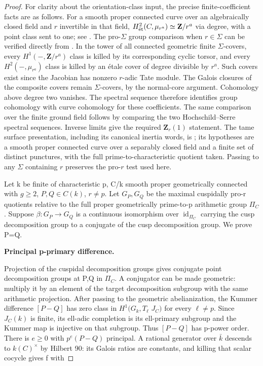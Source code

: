 \begin{proof}

For clarity about the orientation-class input, the precise finite-coefficient
facts are as follows. For a smooth proper connected curve over an
algebraically closed field and \(r\) invertible in that field,
\(H^2_{\et}(C,\mu_{r^a})\simeq\mathbf Z/r^a\) via degree, with a point
class sent to one; see \cite[Proposition 14.2 and Theorem 24.1(a)]{MilneEtale}.
The pro-\(\Sigma\) group comparison when \(r\in\Sigma\) can be verified
directly from \cite[Theorem 14.9 and Remark 14.10]{MilneEtale}.
In the tower of all connected geometric finite \(\Sigma\)-covers,
every \(H^1(-,\mathbf Z/r^a)\) class is killed by its corresponding
cyclic torsor, and every \(H^2(-,\mu_{r^a})\) class is killed by an
étale cover of degree divisible by \(r^a\). Such covers exist since
the Jacobian has nonzero \(r\)-adic Tate module. The Galois closures of
the composite covers remain \(\Sigma\)-covers, by the normal-core
argument. Cohomology above degree two vanishes. The spectral sequence
therefore identifies group cohomology with curve cohomology for these
coefficients. The same comparison over the finite ground field follows
by comparing the two Hochschild--Serre spectral sequences.
Inverse limits give the required \(\mathbf Z_r(1)\) statement.
The tame surface presentation, including its canonical inertia words,
is \cite[Expos\'{e} XIII, Corollary 2.12]{SGA1}; its hypotheses are a
smooth proper connected curve over a separably closed field and a
finite set of distinct punctures, with the full prime-to-characteristic
quotient taken. Passing to any \(\Sigma\) containing \(r\) preserves the
pro-\(r\) test used here.

Let k be finite of characteristic p, C/k smooth proper geometrically connected with \(g{\ge}2\), \(P,Q{\in}C(k)\), \(r{\ne}p\). Let \(G_P,G_Q\) be the maximal cuspidally pro-r quotients relative to the full proper geometrically prime-to-p arithmetic group \({\Pi}_C\). Suppose \({\beta}:G_P{\to}G_Q\) is a continuous isomorphism over \(\operatorname{id}_{{\Pi}_C}\) carrying the cusp decomposition group to a conjugate of the cusp decomposition group. We prove P=Q.

\textbf{Principal p-primary difference.}

Projection of the cuspidal decomposition groups gives conjugate point decomposition groups at P,Q in \({\Pi}_C\). A conjugator can be made geometric: multiply it by an element of the target decomposition subgroup with the same arithmetic projection. After passing to the geometric abelianization, the Kummer difference \([P-Q]\) has zero class in \(H^1(G_k,T_\ell\) \(J_C)\) for every \(\ell{\ne}p\). Since \(J_C(k)\) is finite, its ell-adic completion is its ell-primary subgroup and the Kummer map is injective on that subgroup. Thus \([P-Q]\) has p-power order. There is \(e{\ge}0\) with \(p^e(P-Q)\) principal. A rational generator over \(\bar k\) descends to \(k(C)^{\times}\) by Hilbert 90: its Galois ratios are constants, and killing that scalar cocycle gives f with


\end{proof}
